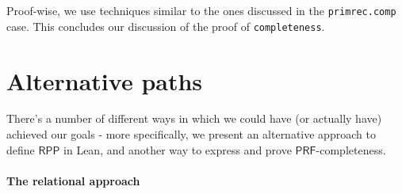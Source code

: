 \documentclass{book}
\theoremstyle{definition}
\theoremstyle{remark}
\theoremstyle{plain}
\newcommand{\RPP}{\mathsf{RPP}}
\newcommand{\PRF}{\mathsf{PRF}}
\begin{document}
Proof-wise, we use techniques similar to the ones discussed in the \lstinline{primrec.comp} case.
This concludes our discussion of the proof of \lstinline{completeness}.

\newpage
\section{Alternative paths} \label{alternatives}

There's a number of different ways in which we could have (or actually have) achieved our goals -
more specifically, we present an alternative approach to define $\RPP$ in Lean, and another way to express and
prove $\PRF$-completeness.

\paragraph{The relational approach}
\end{document}
